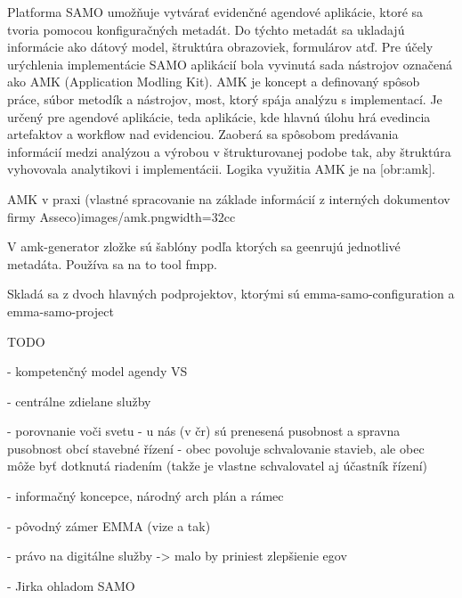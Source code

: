 
Platforma SAMO umožňuje vytvárať evidenčné agendové aplikácie, ktoré sa tvoria pomocou konfiguračných metadát. Do týchto metadát sa ukladajú informácie ako dátový model, štruktúra obrazoviek, formulárov atď. Pre účely urýchlenia implementácie SAMO aplikácií bola vyvinutá sada nástrojov označená ako AMK (Application Modling Kit). AMK je koncept a definovaný spôsob práce, súbor metodík a nástrojov, most, ktorý spája analýzu s implementací. Je určený pre agendové aplikácie, teda aplikácie, kde hlavnú úlohu hrá evedincia artefaktov a workflow nad evidenciou. Zaoberá sa spôsobom predávania informácií medzi analýzou a výrobou v štrukturovanej podobe tak, aby štruktúra vyhovovala analytikovi i implementácii. Logika využitia AMK je na [obr:amk].

%

{AMK v praxi (vlastné spracovanie na základe informácií z interných dokumentov firmy Asseco)}{images/amk.png}{width=32cc}

V amk-generator zložke sú šablóny podľa ktorých sa geenrujú jednotlivé metadáta. Používa sa na to tool fmpp.

Skladá sa z dvoch hlavných podprojektov, ktorými sú emma-samo-configuration a emma-samo-project


\TODO
TODO

- kompetenčný model agendy VS

- centrálne zdielane služby

- porovnanie voči svetu - u nás (v čr) sú prenesená pusobnost a spravna pusobnost obcí
stavebné řízení - obec povoluje schvalovanie stavieb, ale obec môže byť dotknutá riadením (takže je vlastne schvalovatel aj účastník řízení)

- informačný koncepce, národný arch plán a rámec

- pôvodný zámer EMMA (vize a tak)

- právo na digitálne služby -> malo by priniest zlepšienie egov

- Jirka ohladom SAMO


